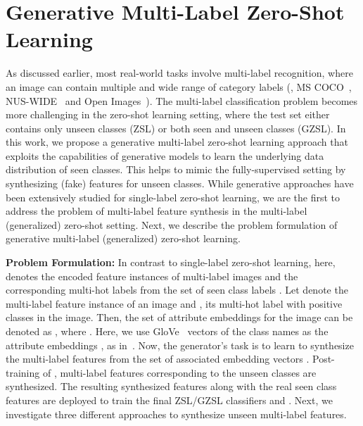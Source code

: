 \documentclass[final]{cvpr}
\begin{document}
\section{Generative Multi-Label Zero-Shot Learning\label{sec:method}}
As discussed earlier, most real-world tasks involve multi-label recognition, where an image can contain multiple and wide range of category labels (\eg, MS COCO~\cite{coco}, NUS-WIDE~\cite{nuswide} and Open Images~\cite{openimages}). The multi-label classification problem becomes more challenging in the zero-shot learning setting, where the test set either contains only unseen classes (ZSL) or both seen and unseen classes (GZSL). In this work, we propose a generative multi-label zero-shot learning approach that exploits the capabilities of generative models to learn the underlying data distribution of seen classes. This helps to mimic the fully-supervised setting by synthesizing (fake) features for unseen classes. While generative approaches have been extensively studied for single-label zero-shot learning, we are the first to address the problem of multi-label feature synthesis in the multi-label (generalized) zero-shot setting. Next, we describe the problem formulation of generative multi-label (generalized) zero-shot learning. 

\noindent\textbf{Problem Formulation:} 
In contrast to single-label zero-shot learning, here,  denotes the encoded feature instances of multi-label images and  the corresponding multi-hot labels from the set of  seen class labels . Let  denote the multi-label feature instance of an image and , its multi-hot label with  positive classes in the image. Then, the set of attribute embeddings for the image can be denoted as , where . Here, we use GloVe~\cite{pennington2014glove} vectors of the class names as the attribute embeddings , as in~\cite{huynh2020shared}.
Now, the generator's task is to learn to synthesize the multi-label features  from the set of associated embedding vectors .
Post-training of , multi-label features corresponding to the unseen classes are synthesized. The resulting synthesized features along with the real seen class features are deployed to train the final ZSL/GZSL classifiers  and . Next, we investigate three different approaches to synthesize unseen multi-label features. 
\end{document}

